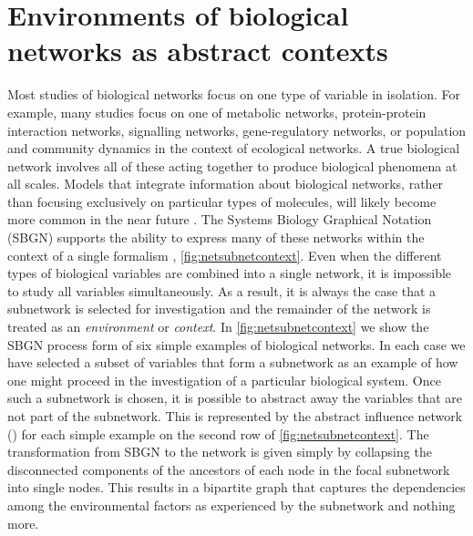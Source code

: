 
\section{Environments of biological networks as abstract contexts}\label{sec:networkcontext}
Most studies of biological networks focus on one type of variable in isolation. For example, many studies focus on one of metabolic networks, protein-protein interaction networks, signalling networks, gene-regulatory networks, or population and community dynamics in the context of ecological networks. A true biological network involves all of these acting together to produce biological phenomena at all scales. Models that integrate information about biological networks, rather than focusing exclusively on particular types of molecules, will likely become more common in the near future \cite{Covert2008,Karr2012,Macklin2014}. The Systems Biology Graphical Notation (SBGN) supports the ability to express many of these networks within the context of a single formalism \cite{LeNovere2009}, \ref{fig:netsubnetcontext}. Even when the different types of biological variables are combined into a single network, it is impossible to study all variables simultaneously. As a result, it is always the case that a subnetwork is selected for investigation and the remainder of the network is treated as an \emph{environment} or \emph{context}. In \ref{fig:netsubnetcontext} we show the SBGN process form of six simple examples of biological networks. In each case we have selected a subset of variables that form a subnetwork as an example of how one might proceed in the investigation of a particular biological system. Once such a subnetwork is chosen, it is possible to abstract away the variables that are not part of the subnetwork. This is represented by the abstract influence network (\AI{}) for each simple example on the second row of \ref{fig:netsubnetcontext}. The transformation from SBGN to the \AI{} network is given simply by collapsing the disconnected components of the ancestors of each node in the focal subnetwork into single \AI{} nodes. This results in a bipartite graph that captures the dependencies among the environmental factors as experienced by the subnetwork and nothing more.

